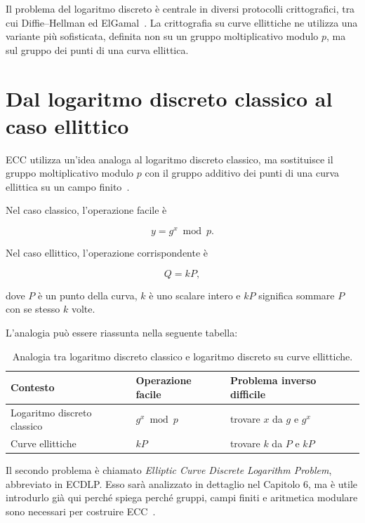 \documentclass[12pt,a4paper,oneside]{report}
\begin{document}
Il problema del logaritmo discreto è centrale in diversi protocolli crittografici, tra cui Diffie--Hellman ed ElGamal~\cite{margara_dh,margara_elgamal}. La crittografia su curve ellittiche ne utilizza una variante più sofisticata, definita non su un gruppo moltiplicativo modulo \(p\), ma sul gruppo dei punti di una curva ellittica.

\section{Dal logaritmo discreto classico al caso ellittico}

ECC utilizza un'idea analoga al logaritmo discreto classico, ma sostituisce il gruppo moltiplicativo modulo \(p\) con il gruppo additivo dei punti di una curva ellittica su un campo finito~\cite{margara_ec}.

Nel caso classico, l'operazione facile è

\begin{equation}
    y = g^x \bmod p.
\end{equation}

Nel caso ellittico, l'operazione corrispondente è

\begin{equation}
    Q = kP,
\end{equation}

dove \(P\) è un punto della curva, \(k\) è uno scalare intero e \(kP\) significa sommare \(P\) con se stesso \(k\) volte.

L'analogia può essere riassunta nella seguente tabella:

\begin{table}[h]
\centering
\begin{tabular}{lll}
\toprule
\textbf{Contesto} & \textbf{Operazione facile} & \textbf{Problema inverso difficile} \\
\midrule
Logaritmo discreto classico & \(g^x \bmod p\) & trovare \(x\) da \(g\) e \(g^x\) \\
Curve ellittiche & \(kP\) & trovare \(k\) da \(P\) e \(kP\) \\
\bottomrule
\end{tabular}
\caption{Analogia tra logaritmo discreto classico e logaritmo discreto su curve ellittiche.}
\label{tab:dlp-ecdlp}
\end{table}

Il secondo problema è chiamato \textit{Elliptic Curve Discrete Logarithm Problem}, abbreviato in ECDLP. Esso sarà analizzato in dettaglio nel Capitolo 6, ma è utile introdurlo già qui perché spiega perché gruppi, campi finiti e aritmetica modulare sono necessari per costruire ECC~\cite{margara_ec,sec1}.
\end{document}

